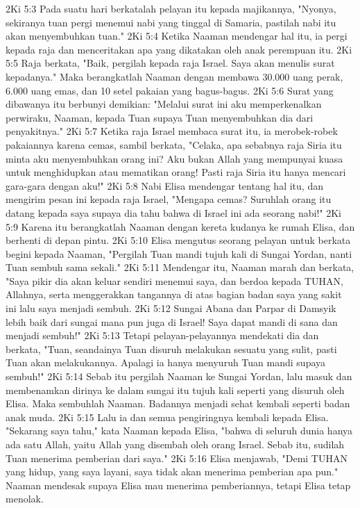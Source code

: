2Ki 5:3  Pada suatu hari berkatalah pelayan itu kepada majikannya, "Nyonya, sekiranya tuan pergi menemui nabi yang tinggal di Samaria, pastilah nabi itu akan menyembuhkan tuan."
2Ki 5:4  Ketika Naaman mendengar hal itu, ia pergi kepada raja dan menceritakan apa yang dikatakan oleh anak perempuan itu.
2Ki 5:5  Raja berkata, "Baik, pergilah kepada raja Israel. Saya akan menulis surat kepadanya." Maka berangkatlah Naaman dengan membawa 30.000 uang perak, 6.000 uang emas, dan 10 setel pakaian yang bagus-bagus.
2Ki 5:6  Surat yang dibawanya itu berbunyi demikian: "Melalui surat ini aku memperkenalkan perwiraku, Naaman, kepada Tuan supaya Tuan menyembuhkan dia dari penyakitnya."
2Ki 5:7  Ketika raja Israel membaca surat itu, ia merobek-robek pakaiannya karena cemas, sambil berkata, "Celaka, apa sebabnya raja Siria itu minta aku menyembuhkan orang ini? Aku bukan Allah yang mempunyai kuasa untuk menghidupkan atau mematikan orang! Pasti raja Siria itu hanya mencari gara-gara dengan aku!"
2Ki 5:8  Nabi Elisa mendengar tentang hal itu, dan mengirim pesan ini kepada raja Israel, "Mengapa cemas? Suruhlah orang itu datang kepada saya supaya dia tahu bahwa di Israel ini ada seorang nabi!"
2Ki 5:9  Karena itu berangkatlah Naaman dengan kereta kudanya ke rumah Elisa, dan berhenti di depan pintu.
2Ki 5:10  Elisa mengutus seorang pelayan untuk berkata begini kepada Naaman, "Pergilah Tuan mandi tujuh kali di Sungai Yordan, nanti Tuan sembuh sama sekali."
2Ki 5:11  Mendengar itu, Naaman marah dan berkata, "Saya pikir dia akan keluar sendiri menemui saya, dan berdoa kepada TUHAN, Allahnya, serta menggerakkan tangannya di atas bagian badan saya yang sakit ini lalu saya menjadi sembuh.
2Ki 5:12  Sungai Abana dan Parpar di Damsyik lebih baik dari sungai mana pun juga di Israel! Saya dapat mandi di sana dan menjadi sembuh!"
2Ki 5:13  Tetapi pelayan-pelayannya mendekati dia dan berkata, "Tuan, seandainya Tuan disuruh melakukan sesuatu yang sulit, pasti Tuan akan melakukannya. Apalagi ia hanya menyuruh Tuan mandi supaya sembuh!"
2Ki 5:14  Sebab itu pergilah Naaman ke Sungai Yordan, lalu masuk dan membenamkan dirinya ke dalam sungai itu tujuh kali seperti yang disuruh oleh Elisa. Maka sembuhlah Naaman. Badannya menjadi sehat kembali seperti badan anak muda.
2Ki 5:15  Lalu ia dan semua pengiringnya kembali kepada Elisa. "Sekarang saya tahu," kata Naaman kepada Elisa, "bahwa di seluruh dunia hanya ada satu Allah, yaitu Allah yang disembah oleh orang Israel. Sebab itu, sudilah Tuan menerima pemberian dari saya."
2Ki 5:16  Elisa menjawab, "Demi TUHAN yang hidup, yang saya layani, saya tidak akan menerima pemberian apa pun." Naaman mendesak supaya Elisa mau menerima pemberiannya, tetapi Elisa tetap menolak.
